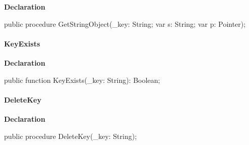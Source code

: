 \documentclass{report}
\newif\ifpdf
\begin{document}
\label{PasDoc_Hashes.THash-GetStringObject}
\begin{list}{}{
\setlength{\itemindent}{0cm}
\setlength{\listparindent}{0cm}
\setlength{\leftmargin}{\evensidemargin}
\addtolength{\leftmargin}{\tmplength}
\settowidth{\labelsep}{X}
\addtolength{\leftmargin}{\labelsep}
\setlength{\labelwidth}{\tmplength}
}
\item[\textbf{Declaration}\hfill]
\ifpdf
\begin{flushleft}
\fi
\begin{ttfamily}
public procedure GetStringObject({\_}key: String; var s: String; var p: Pointer);\end{ttfamily}

\ifpdf
\end{flushleft}
\fi

\end{list}
\paragraph*{KeyExists}\hspace*{\fill}

\label{PasDoc_Hashes.THash-KeyExists}
\begin{list}{}{
\setlength{\itemindent}{0cm}
\setlength{\listparindent}{0cm}
\setlength{\leftmargin}{\evensidemargin}
\addtolength{\leftmargin}{\tmplength}
\settowidth{\labelsep}{X}
\addtolength{\leftmargin}{\labelsep}
\setlength{\labelwidth}{\tmplength}
}
\item[\textbf{Declaration}\hfill]
\ifpdf
\begin{flushleft}
\fi
\begin{ttfamily}
public function KeyExists({\_}key: String): Boolean;\end{ttfamily}

\ifpdf
\end{flushleft}
\fi

\end{list}
\paragraph*{DeleteKey}\hspace*{\fill}

\label{PasDoc_Hashes.THash-DeleteKey}
\begin{list}{}{
\setlength{\itemindent}{0cm}
\setlength{\listparindent}{0cm}
\setlength{\leftmargin}{\evensidemargin}
\addtolength{\leftmargin}{\tmplength}
\settowidth{\labelsep}{X}
\addtolength{\leftmargin}{\labelsep}
\setlength{\labelwidth}{\tmplength}
}
\item[\textbf{Declaration}\hfill]
\ifpdf
\begin{flushleft}
\fi
\begin{ttfamily}
public procedure DeleteKey({\_}key: String);\end{ttfamily}

\ifpdf
\end{flushleft}
\fi

\end{list}
\end{document}
